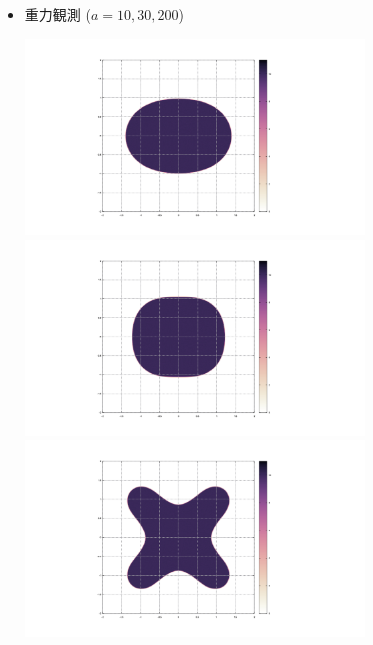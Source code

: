 \documentclass[a0paper,dvipdfmx,helvet,logo=logo.png,hlcolor=F70146]{modernposter}
\begin{document}
\begin{postercolumn}
{    \begin{itemize}
      \item 重力観測 ($a=10, 30, 200$)
      \begin{center}
        \includegraphics[width=9cm]{fig2/GN300K100R10E2.png}
        \includegraphics[width=9cm]{fig2/GN300K100R30E2.png}
        \includegraphics[width=9cm]{fig3/GN300K100R200E2.png}
      \end{center}


\end{itemize}}
\end{postercolumn}
\end{document}
